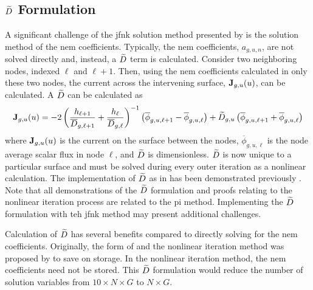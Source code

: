   \subsection{\texorpdfstring{$\widetilde{D}$ Formulation}{D\textasciitilde \ Formulation}}
    \label{sec:dtilde_formulation}

    A significant challenge of the \gls{jfnk} solution method presented by
    \citeauthor{qe2paper} is the solution method of the \gls{nem} coefficients.
    Typically, the \gls{nem} coefficients, $a_{g,u,n}$, are not solved directly
    and, instead, a $\widetilde{D}$ term is calculated. Consider two neighboring
    nodes, indexed $\ell$ and $\ell+1$. Then, using the \gls{nem} coefficients
    calculated in only these two nodes, the current across the intervening
    surface, $\mathbf{J}_{g,u}(u)$, can be calculated. A $\widetilde{D}$ can be
    calculated as
    \begin{equation}
      \label{eq:dtilde}
      \mathbf{J}_{g,u}(u) = 
        -2 \left( \frac{h_{\ell+1}}{\overline{D}_{g,\ell+1}} + 
          \frac{h_{\ell}}{\overline{D}_{g,\ell}} \right)^{-1}
          \left( \overline{\phi}_{g,u,\ell+1} -
          \overline{\phi}_{g,u,\ell} \right) + 
        \widetilde{D}_{g,u} \left( \overline{\phi}_{g,u,\ell+1} +
          \overline{\phi}_{g,u,\ell} \right)
    \end{equation}
    where $\mathbf{J}_{g,u}(u)$ is the current on the surface between the nodes,
    $\overline{\phi}_{g,u,\ell}$ is the node average scalar flux in node $\ell$,
    and $\widetilde{D}$ is dimensionless. $\widetilde{D}$ is now unique to a particular
    surface and must be solved during every outer iteration as a nonlinear
    calculation. The implementation of $\widetilde{D}$ as in  has been
    demonstrated previously \cite{smith_nonlinear,palmtagThesis}. Note that all
    demonstrations of the $\widetilde{D}$ formulation and proofs relating to the
    nonlinear iteration process are related to the \gls{pi} method. Implementing
    the $\widetilde{D}$ formulation with teh \gls{jfnk} method may present additional
    challenges.

    Calculation of $\widetilde{D}$ has several benefits compared to directly solving
    for the \gls{nem} coefficients. Originally, the form of  and
    the nonlinear iteration method was proposed by \citeauthor{smith_nonlinear}
    to save on storage. In the nonlinear iteration method, the \gls{nem}
    coefficients need not be stored. This $\widetilde{D}$ formulation would reduce the
    number of solution variables from $10 \times N \times G$ to $N \times G$.

